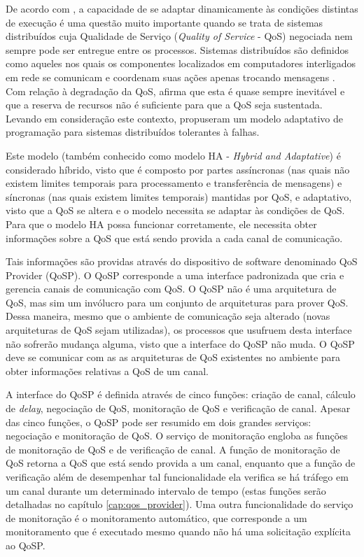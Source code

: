 \acresetall

	De acordo com \cite{GMCR07}, a capacidade de se adaptar dinamicamente às condições distintas de execução é uma questão muito importante quando se trata de sistemas distribuídos cuja Qualidade de Serviço (\textit{Quality of Service} - QoS) negociada nem sempre pode ser entregue entre os processos. Sistemas distribuídos são definidos como aqueles nos quais os componentes localizados em computadores interligados em rede se comunicam e coordenam suas ações apenas trocando mensagens \cite{COLDOKIN07}. Com relação à degradação da QoS, \cite{JTK00} afirma que esta é quase sempre inevitável e que a reserva de recursos não é suficiente para que a QoS seja sustentada. Levando em consideração este contexto, \cite{GMCR07} propuseram um modelo adaptativo de programação para sistemas distribuídos tolerantes à falhas.
	
	Este modelo (também conhecido como modelo HA - \textit{Hybrid and Adaptative}) é considerado híbrido, visto que é composto por partes assíncronas (nas quais não existem limites temporais para processamento e transferência de mensagens) e síncronas (nas quais existem limites temporais) mantidas por QoS, e adaptativo, visto que a QoS se altera e o modelo necessita se adaptar às condições de QoS. Para que o modelo HA possa funcionar corretamente, ele necessita obter informações sobre a QoS que está sendo provida a cada canal de comunicação.
	
	Tais informações são providas através do dispositivo de software denominado QoS Provider (QoSP). O QoSP corresponde a uma interface padronizada que cria e gerencia canais de comunicação com QoS. O QoSP não é uma arquitetura de QoS, mas sim um invólucro para um conjunto de arquiteturas para prover QoS. Dessa maneira, mesmo que o ambiente de comunicação seja alterado (novas arquiteturas de QoS sejam utilizadas), os processos que usufruem desta interface não sofrerão mudança alguma, visto que a interface do QoSP não muda. O QoSP deve se comunicar com as as arquiteturas de QoS existentes no ambiente para obter informações relativas a QoS de um canal.
	
	A interface do QoSP é definida através de cinco funções: criação de canal, cálculo de \textit{delay}, negociação de QoS, monitoração de QoS e verificação de canal. Apesar das cinco funções, o QoSP pode ser resumido em dois grandes serviços: negociação e monitoração de QoS. O serviço de monitoração engloba as funções de monitoração de QoS e de verificação de canal. A função de monitoração de QoS retorna a QoS que está sendo provida a um canal, enquanto que a função de verificação além de desempenhar tal funcionalidade ela verifica se há tráfego em um canal durante um determinado intervalo de tempo (estas funções serão detalhadas no capítulo \ref{cap:qos_provider}). Uma outra funcionalidade do serviço de monitoração é o monitoramento automático, que corresponde a um monitoramento que é executado mesmo quando não há uma solicitação explícita ao QoSP. 
	
